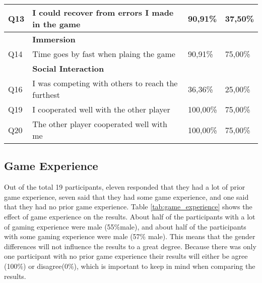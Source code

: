 \begin{table}[ht]
\begin{tabularx}{\textwidth}{|l|X|l|l|}
		Q13         & I could recover from errors I made in the game                 & 90,91\%        & 37,50\%         \\ \hline
		& \textbf{Immersion}                                             &                &                 \\ \hline
		Q14         & Time goes by fast when plaing the game                         & 90,91\%        & 75,00\%         \\ \hline
		& \textbf{Social Interaction}                                    &                &                 \\ \hline
		Q16         & I was competing with others to reach the furthest              & 36,36\%        & 25,00\%         \\ \hline
		Q19         & I cooperated well with the other player                        & 100,00\%       & 75,00\%         \\ \hline
		Q20         & The other player cooperated well with me                       & 100,00\%       & 75,00\%         \\ \hline
	\end{tabularx}
\end{table}

\subsection{Game Experience}
Out of the total 19 participants, eleven responded that they had a lot of prior game experience, seven said that they had some game experience, and one said that they had no prior game experience. Table \ref{tab:game_experience} shows the effect of game experience on the results. About half of the participants with a lot of gaming experience were male (55\%male), and about half of the participants with some gaming experience were male (57\% male). This means that the gender differences will not influence the results to a great degree. Because there was only one participant with no prior game experience their results will either be agree (100\%) or disagree(0\%), which is important to keep in mind when comparing the results. 

